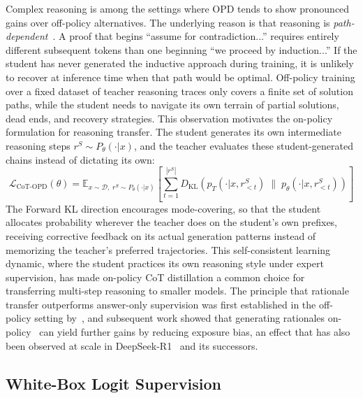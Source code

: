 \documentclass{article} %
\newcommand{\E}{\mathbb{E}}
\newcommand{\KL}{D_{\mathrm{KL}}}
\newcommand{\ptheta}{p_\theta}
\newcommand{\pteacher}{p_T}
\newcommand{\loss}{\mathcal{L}}
\begin{document}
Complex reasoning is among the settings where OPD tends to show pronounced gains over off-policy alternatives. The underlying reason is that reasoning is \emph{path-dependent}~\citep{2306.13649}. A proof that begins ``assume for contradiction...'' requires entirely different subsequent tokens than one beginning ``we proceed by induction...'' If the student has never generated the inductive approach during training, it is unlikely to recover at inference time when that path would be optimal. Off-policy training over a fixed dataset of teacher reasoning traces only covers a finite set of solution paths, while the student needs to navigate its own terrain of partial solutions, dead ends, and recovery strategies. This observation motivates the on-policy formulation for reasoning transfer. The student generates its own intermediate reasoning steps $r^S \sim P_\theta(\cdot|x)$, and the teacher evaluates these student-generated chains instead of dictating its own:
\begin{equation}
    \loss_{\text{CoT-OPD}}(\theta) = \E_{x \sim \mathcal{D},\; r^S \sim P_\theta(\cdot|x)} \left[ \sum_{t=1}^{|r^S|} \KL\!\left( \pteacher(\cdot|x, r^S_{<t}) \;\|\; \ptheta(\cdot|x, r^S_{<t}) \right) \right]
\end{equation}
The Forward KL direction encourages mode-covering, so that the student allocates probability wherever the teacher does on the student's own prefixes, receiving corrective feedback on its actual generation patterns instead of memorizing the teacher's preferred trajectories. This self-consistent learning dynamic, where the student practices its own reasoning style under expert supervision, has made on-policy CoT distillation a common choice for transferring multi-step reasoning to smaller models. The principle that rationale transfer outperforms answer-only supervision was first established in the off-policy setting by~\citet{2305.02301}, and subsequent work showed that generating rationales on-policy~\citep{2306.13649} can yield further gains by reducing exposure bias, an effect that has also been observed at scale in DeepSeek-R1~\citep{2501.12948} and its successors.

\subsection{White-Box Logit Supervision}
\label{subsec:white_box}
\end{document}
